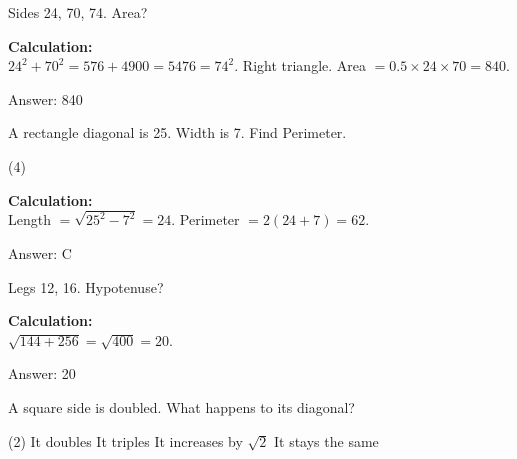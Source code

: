 \documentclass[11pt,paper=a4,answers]{exam}
\begin{document}
\begin{questions}
\vspace{60pt}

\question
Sides 24, 70, 74. Area?

\begin{solution}
\textbf{Calculation:} \\
$24^2 + 70^2 = 576 + 4900 = 5476 = 74^2$. Right triangle. Area $= 0.5 \times 24 \times 70 = 840$.

\vspace{30pt}

Answer: \colorbox{yellow!100}{840}
\end{solution}

\vspace{60pt}

\question
A rectangle diagonal is 25. Width is 7. Find Perimeter.
\begin{tasks}(4)
\end{tasks}

\begin{solution}
\textbf{Calculation:} \\
Length $= \sqrt{25^2 - 7^2} = 24$. Perimeter $= 2(24 + 7) = 62$.

\vspace{30pt}

Answer: \colorbox{yellow!100}{C}
\end{solution}

\vspace{60pt}

\question
Legs 12, 16. Hypotenuse?

\begin{solution}
\textbf{Calculation:} \\
$\sqrt{144 + 256} = \sqrt{400} = 20$.

\vspace{30pt}

Answer: \colorbox{yellow!100}{20}
\end{solution}

\vspace{60pt}

\question
A square side is doubled. What happens to its diagonal?
\begin{tasks}(2)
    \task It doubles
    \task It triples
    \task It increases by $\sqrt{2}$
    \task It stays the same
\end{tasks}


\end{questions}
\end{document}
